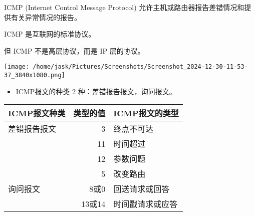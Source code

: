 \documentclass[11pt]{article}
\begin{document}
\begin{enumerate}
ICMP (Internet Control Message Protocol) 允许主机或路由器报告差错情况和提供有关异常情况的报告。

ICMP 是互联网的标准协议。

但 ICMP 不是高层协议，而是 IP 层的协议。

\begin{center}
\texttt{[image: /home/jask/Pictures/Screenshots/Screenshot\_2024-12-30-11-53-37\_3840x1080.png]}
\end{center}

\begin{itemize}
\item ICMP报文的种类
2 种：差错报告报文，询问报文。
\end{itemize}

\begin{center}
\begin{tabular}{lrl}
ICMP报文种类 & 类型的值 & ICMP报文的类型\\
\hline
差错报告报文 & 3 & 终点不可达\\
 & 11 & 时间超过\\
 & 12 & 参数问题\\
 & 5 & 改变路由\\
询问报文 & 8或0 & 回送请求或回答\\
 & 13或14 & 时间戳请求或应答\\
\end{tabular}
\end{center}


\end{enumerate}
\end{document}
